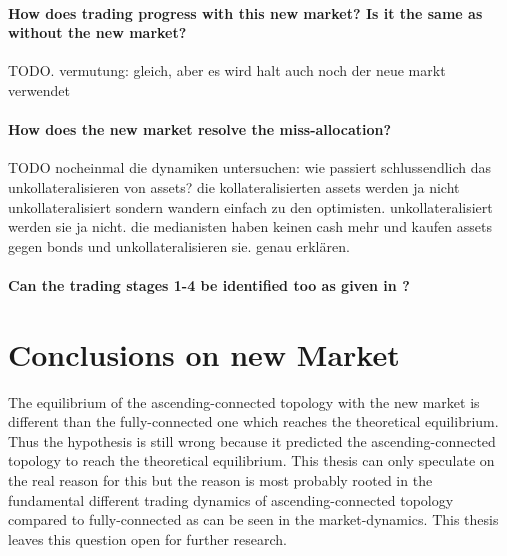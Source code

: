 \documentclass[Bachelorarbeit.tex]{subfiles}
\begin{document}
\paragraph{How does trading progress with this new market? Is it the same as without the new market?}
TODO. vermutung: gleich, aber es wird halt auch noch der neue markt verwendet

\paragraph{How does the new market resolve the miss-allocation?}
TODO nocheinmal die dynamiken untersuchen: wie passiert schlussendlich das unkollateralisieren von assets? die kollateralisierten assets werden ja nicht unkollateralisiert sondern wandern einfach zu den optimisten. unkollateralisiert werden sie ja nicht. die medianisten haben keinen cash mehr und kaufen assets gegen bonds und unkollateralisieren sie. genau erklären.

\paragraph{Can the trading stages 1-4 be identified too as given in \cite{Breuer_2015}?}



\section{Conclusions on new Market}
The equilibrium of the ascending-connected topology with the new market is different than the fully-connected one which reaches the theoretical equilibrium. Thus the hypothesis is still wrong because it predicted the ascending-connected topology to reach the theoretical equilibrium. This thesis can only speculate on the real reason for this but the reason is most probably rooted in the fundamental different trading dynamics of ascending-connected topology compared to fully-connected as can be seen in the market-dynamics. This thesis leaves this question open for further research.
\end{document}
